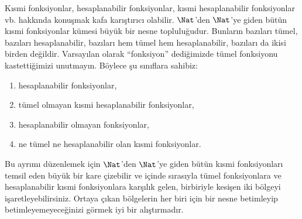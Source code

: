 Kısmi fonksiyonlar, hesaplanabilir fonksiyonlar, kısmi hesaplanabilir
fonksiyonlar vb. hakkında konuşmak kafa karıştırıcı olabilir. $\Nat$'den
$\Nat$'ye giden bütün kısmi fonksiyonlar kümesi büyük bir nesne
topluluğudur. Bunların bazıları tümel, bazıları hesaplanabilir, bazıları hem
tümel hem hesaplanabilir, bazıları da ikisi birden değildir. Varsayılan olarak
``fonksiyon'' dediğimizde tümel fonksiyonu kastettiğimizi unutmayın. Böylece
şu sınıflara sahibiz:
\begin{enumerate}
\item hesaplanabilir fonksiyonlar,
\item tümel olmayan kısmi hesaplanabilir fonksiyonlar,
\item hesaplanabilir olmayan fonksiyonlar,
\item ne tümel ne hesaplanabilir olan kısmi fonksiyonlar.
\end{enumerate}
Bu ayrımı düzenlemek için $\Nat$'den $\Nat$'ye giden bütün kısmi
fonksiyonları temsil eden büyük bir kare çizebilir ve içinde sırasıyla tümel
fonksiyonlara ve hesaplanabilir kısmi fonksiyonlara karşılık gelen, birbiriyle
kesişen iki bölgeyi işaretleyebilirsiniz. Ortaya çıkan bölgelerin her biri
için bir nesne betimleyip betimleyemeyeceğinizi görmek iyi bir alıştırmadır.

